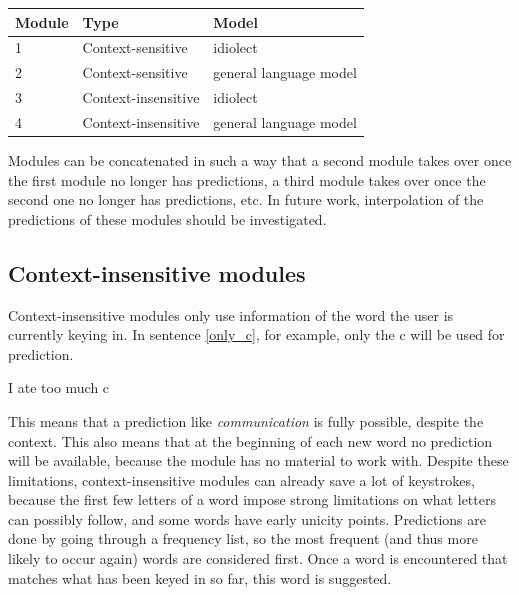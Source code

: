 \documentclass[12pt]{article}
\let\originaltable\table
\let\endoriginaltable\endtable
\renewenvironment{table}[1][ht]{%
  \originaltable[#1]
  \centering}%
  {\endoriginaltable}
\begin{document}
\begin{table}[htb]
\begin{tabular}{lll} 
Module&Type&Model\\
\hline
1& {\footnotesize Context-sensitive} & {\footnotesize idiolect}\\
2& {\footnotesize Context-sensitive} & {\footnotesize general language model} \\
3& {\footnotesize Context-insensitive} & {\footnotesize idiolect}\\ 
4& {\footnotesize Context-insensitive} & {\footnotesize general language model} \\
\end{tabular} 
\caption{Four possible modules: combinations of type and language model}
\end{table}

Modules can be concatenated in such a way that a second module takes over once the first module no longer has predictions, a third module takes over once the second one no longer has predictions, etc. In future work, interpolation of the predictions of these modules should be investigated.

\subsection{Context-insensitive modules} \label{ci}

Context-insensitive modules only use information of the word the user is currently keying in. In sentence \ref{only_c}, for example, only the c will be used for prediction. 

\begin{examples}
\item I ate too much c \label{only_c}
\end{examples}

This means that a prediction like \emph{communication} is fully possible, despite the context. This also means that at the beginning of each new word no prediction will be available, because the module has no material to work with. Despite these limitations, context-insensitive modules can already save a lot of keystrokes, because the first few letters of a word impose strong limitations on what letters can possibly follow, and some words have early unicity points. Predictions are done by going through a frequency list, so the most frequent (and thus more likely to occur again) words are considered first. Once a word is encountered that matches what has been keyed in so far, this word is suggested.
\end{document}
